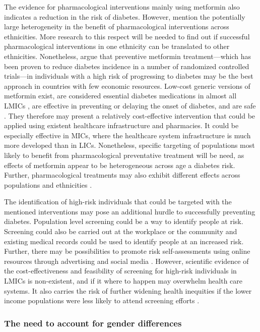 The evidence for pharmacological interventions mainly using metformin also indicates a reduction in the risk of diabetes. However, \textcite{Cefalu2016} mention the potentially large heterogeneity in the benefit of pharmacological interventions across ethnicities. More research to this respect will be needed to find out if successful pharmacological interventions in one ethnicity can be translated to other ethnicities. Nonetheless, \textcite{Cefalu2016} argue that preventive metformin treatment---which has been proven to reduce diabetes incidence in a number of randomized controlled trials---in individuals with a high risk of progressing to diabetes may be the best approach in countries with few economic resources. Low-cost generic versions of metformin exist, are considered essential diabetes medications in almost all \acp{LMIC} \parencite{Bazargani2014}, are effective in preventing or delaying the onset of diabetes, and are safe \parencite{Gomes2013}. They therefore may present a relatively cost-effective intervention that could be applied using existent healthcare infrastructure and pharmacies. It could be especially effective in \acp{MIC}, where the healthcare system infrastructure is much more developed than in \acp{LIC}. Nonetheless, specific targeting of populations most likely to benefit from pharmacological preventative treatment will be need, as effects of metformin appear to be heterogeneous across age a diabetes risk. Further, pharmacological treatments may also exhibit different effects across populations and ethnicities \parencite{Cefalu2016}. 

The identification of high-risk individuals that could be targeted with the mentioned interventions may pose an additional hurdle to successfully preventing diabetes. Population level screening could be a way to identify people at risk. Screening could also be carried out at the workplace or the community and existing medical records could be used to identify people at an increased risk. Further, there may be possibilities to promote risk self-assessments using online resources through advertising and social media \parencite{Cefalu2016}. However, scientific evidence of the cost-effectiveness and feasibility of screening for high-risk individuals in \acp{LMIC} is non-existent, and if it where to happen may overwhelm health care systems. It also carries the risk of further widening health inequities if the lower income populations were less likely to attend screening efforts \parencite{Wareham2016}.

\subsubsection{The need to account for gender differences}

